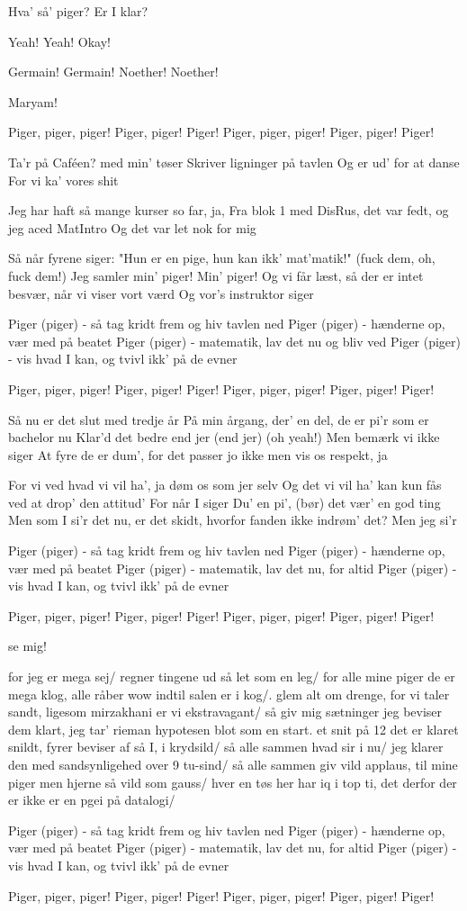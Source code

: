 \documentclass[a4paper,11pt]{article}
\begin{document}
\begin{song}
 Hva' så' piger? Er I klar?

Yeah! Yeah! Okay!

Germain! Germain! Noether! Noether!

Maryam!

Piger, piger, piger! Piger, piger! Piger!
Piger, piger, piger! Piger, piger! Piger!

Ta'r på Caféen? med min' tøser
Skriver ligninger på tavlen
Og er ud' for at danse
For vi ka' vores shit

Jeg har haft så mange kurser so far, ja,
Fra blok 1 med DisRus, det var fedt, og jeg aced MatIntro
Og det var let nok for mig

Så når fyrene siger: "Hun er en pige, hun kan ikk' mat'matik!"
(fuck dem, oh, fuck dem!)
Jeg samler min' piger! Min' piger!
Og vi får læst, så der er intet besvær,
når vi viser vort værd
Og vor's instruktor siger

Piger (piger) - så tag kridt frem og hiv tavlen ned
Piger (piger) - hænderne op, vær med på beatet
Piger (piger) - matematik, lav det nu og bliv ved
Piger (piger) - vis hvad I kan, og tvivl ikk' på de evner

Piger, piger, piger! Piger, piger! Piger!
Piger, piger, piger! Piger, piger! Piger!

Så nu er det slut med tredje år
På min årgang, der' en del, de er pi'r som er bachelor nu
Klar'd det bedre end jer (end jer) (oh yeah!)
Men bemærk vi ikke siger
At fyre de er dum', for det passer jo ikke
men vis os respekt, ja

For vi ved hvad vi vil ha', ja døm os som jer selv
Og det vi vil ha' kan kun fås ved at drop' den attitud'
For når I siger
Du' en pi', (bør) det vær' en god ting
Men som I si'r det nu, er det
skidt, hvorfor fanden ikke indrøm' det?
Men jeg si'r

Piger (piger) - så tag kridt frem og hiv tavlen ned
Piger (piger) - hænderne op, vær med på beatet
Piger (piger) - matematik, lav det nu, for altid
Piger (piger) - vis hvad I kan, og tvivl ikk' på de evner

Piger, piger, piger! Piger, piger! Piger!
Piger, piger, piger! Piger, piger! Piger!

se mig!

for jeg er mega sej/ regner tingene ud så let som en leg/
for alle mine piger de er mega klog, alle råber wow indtil salen er i kog/.
glem alt om drenge, for vi taler sandt, ligesom mirzakhani er vi ekstravagant/ 
så giv mig sætninger jeg beviser dem klart, jeg tar’ rieman hypotesen blot som en start.
et snit på 12 det er klaret snildt, fyrer beviser af så I, i krydsild/
så alle sammen hvad sir i nu/ jeg klarer den med sandsynligehed over 9 tu-sind/ 
så alle sammen giv vild applaus, til mine piger men hjerne så vild som gauss/
hver en tøs her har iq i top ti, det derfor der er ikke er en pgei på datalogi/

 Piger (piger) - så tag kridt frem og hiv tavlen ned
Piger (piger) - hænderne op, vær med på beatet
Piger (piger) - matematik, lav det nu, for altid
Piger (piger) - vis hvad I kan, og tvivl ikk' på de evner

Piger, piger, piger! Piger, piger! Piger!
Piger, piger, piger! Piger, piger! Piger!
\end{song}
\end{document}
